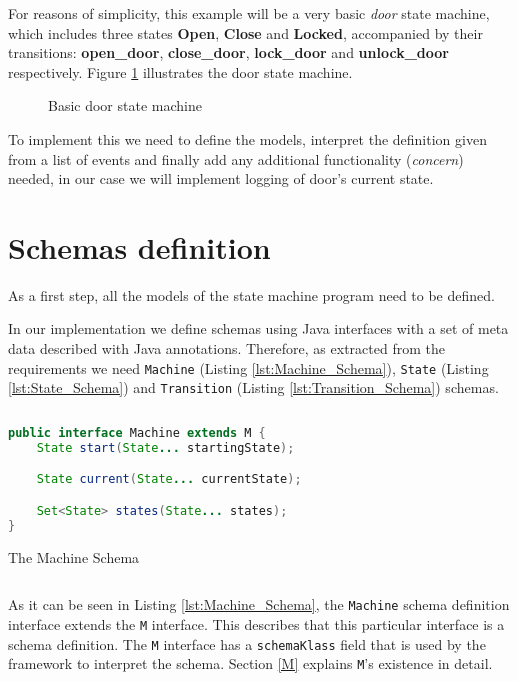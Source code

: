 For reasons of simplicity, this example will be a very basic \textit{door} state machine, which includes three states \textbf{Open}, \textbf{Close} and \textbf{Locked}, accompanied by their transitions: \textbf{open\_door}, \textbf{close\_door}, \textbf{lock\_door} and \textbf{unlock\_door} respectively.
Figure \ref{fig:State_machine} illustrates the door state machine.

\begin{figure}[H]
	\centering
  	\caption{Basic door state machine}
  	\label{fig:State_machine}
\end{figure}

To implement this we need to define the models, interpret the definition given from a list of events and finally add any additional functionality (\textit{concern}) needed, in our case we will implement logging of door's current state.

\section{Schemas definition}
As a first step, all the models of the state machine program need to be defined. 

In our implementation we define schemas using Java interfaces with a set of meta data described with Java annotations.
Therefore, as extracted from the requirements we need \texttt{Machine} (Listing \ref{lst:Machine_Schema}), \texttt{State} (Listing \ref{lst:State_Schema}) and \texttt{Transition} (Listing \ref{lst:Transition_Schema}) schemas.

\begin{sourcecode}[H]
	\begin{lstlisting}[language=Java,escapechar=|]
public interface Machine extends M {
	State start(State... startingState);

	State current(State... currentState);

	Set<State> states(State... states);
}
	\end{lstlisting}
	\caption{The Machine Schema}
	\label{lst:Machine_Schema}
\end{sourcecode}

As it can be seen in Listing \ref{lst:Machine_Schema}, the \texttt{Machine} schema definition interface extends the \texttt{M} interface.
This describes that this particular interface is a schema definition.
The \texttt{M} interface has a \texttt{schemaKlass} field that is used by the framework to interpret the schema.
Section \ref{M} explains \texttt{M}'s existence in detail.

